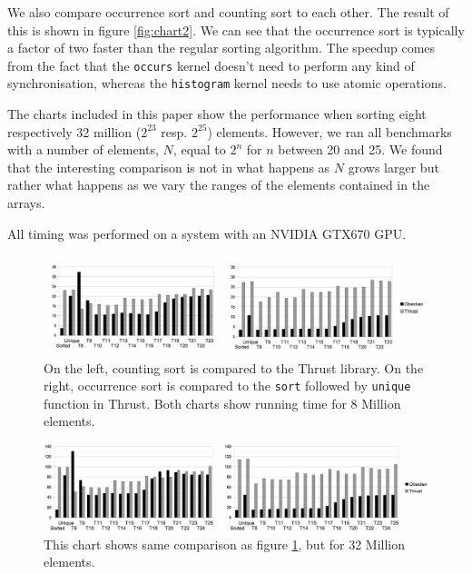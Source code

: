 We also compare occurrence sort and counting sort to each 
other.  The result of this is shown in figure \ref{fig:chart2}. We
can see that the occurrence sort is typically a factor of
two faster than the regular sorting algorithm. The speedup comes from
the fact that the {\tt occurs} kernel doesn't need to perform any kind
of synchronisation, whereas the {\tt histogram} kernel needs to use
atomic operations.

The charts included in this paper show the performance when sorting eight
respectively 32 million ($2^{23}$ resp. $2^{25}$) elements. However, we 
ran all benchmarks with a number of elements, $N$, equal to $2^{n}$ for $n$ 
between 20 and 25. We found that the interesting comparison is not in what 
happens as $N$ grows larger but rather what happens as we vary the ranges 
of the elements contained in the arrays. 

All timing was performed on a system with an NVIDIA GTX670 GPU.  
 
\begin{figure}
\includegraphics[width=\linewidth]{./csort/chart1}
\caption{On the left, counting sort is compared to the Thrust library. 
On the right, occurrence sort is compared to the {\tt sort} followed by {\tt unique} 
function in Thrust. Both charts show running time for 8 Million elements.}
\label{fig:chart1}
\end{figure}

\begin{figure}
\includegraphics[width=\linewidth]{./csort/chart3}
\caption{This chart shows same comparison as figure \ref{fig:chart1}, but for 
32 Million elements.}
\label{fig:chart3}
\end{figure}


